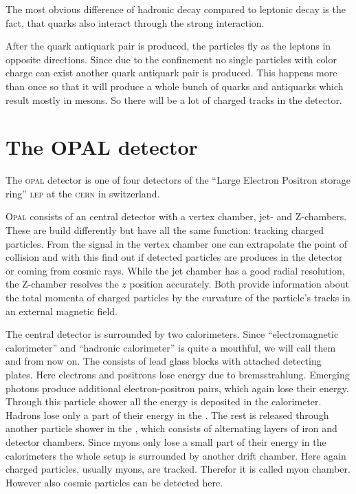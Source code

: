 \documentclass[11pt, english, fleqn, DIV=15, headinclude, BCOR=2cm]{scrreprt}
\begin{document}
The most obvious difference of hadronic decay compared to leptonic decay is
the fact, that quarks also interact through the strong interaction.

After the quark antiquark pair is produced, the particles fly as the leptons
in opposite directions. Since due to the confinement no single particles
with color charge can exist another quark antiquark pair is produced. This
happens more than once so that it will produce a whole bunch of quarks and
antiquarks which result mostly in mesons. So there will be a lot of charged
tracks in the detector.

\section{The OPAL detector}

The \textsc{opal} detector is one of four detectors of the \enquote{Large
Electron Positron storage ring} \textsc{lep} at the \textsc{cern} in
switzerland.

\textsc{Opal} consists of an central detector with a vertex chamber, jet- and
Z-chambers. These are build differently but have all the same function:
tracking charged particles. From the signal in the vertex chamber one can
extrapolate the point of collision and with this find out if detected
particles are produces in the detector or coming from cosmic rays. While the
jet chamber has a good radial resolution, the Z-chamber resolves the $z$
position accurately. Both provide information about the total momenta of
charged particles by the curvature of the particle's tracks in an external
magnetic field.

The central detector is surrounded by two calorimeters.  Since
\enquote{electromagnetic calorimeter} and \enquote{hadronic calorimeter} is
quite a mouthful, we will call them \ecal{} and \hcal{} from now on.  The
\ecal{} consists of lead glass blocks with attached detecting plates. Here
electrons and positrons lose energy due to bremsstrahlung. Emerging photons
produce additional electron-positron pairs, which again lose their energy.
Through this particle shower all the energy is deposited in the calorimeter.
Hadrons lose only a part of their energy in the \ecal{}. The rest is released
through another particle shower in the \hcal{}, which consists of alternating
layers of iron and detector chambers. Since myons only lose a small part of
their energy in the calorimeters the whole setup is surrounded by another
drift chamber. Here again charged particles, usually myons, are tracked.
Therefor it is called myon chamber. However also cosmic particles can be
detected here.
\end{document}
